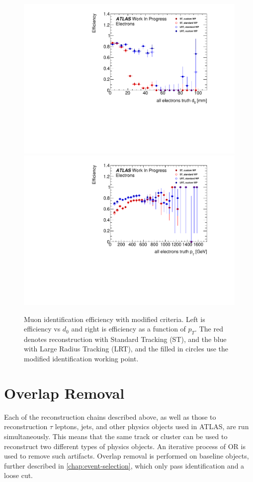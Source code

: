 \begin{figure}[htbp]
\centering
\includegraphics[width=.48\textwidth]{figures/EventReconstruction/wp_e_d0_all_wip.pdf}
\includegraphics[width=.48\textwidth]{figures/EventReconstruction/wp_e_pt_all_wip.pdf}
\caption{Muon identification efficiency with modified criteria. Left is efficiency vs $d_{0}$ and right is efficiency as a function of $p_{T}$. The red denotes reconstruction with Standard Tracking (ST), and the blue with Large Radius Tracking (LRT), and the filled in circles use the modified identification working point. }
\label{fig:cust_elec_eff}
\end{figure}

\section{Overlap Removal}
Each of the reconstruction chains described above, as well as those to reconstruction $\tau$ leptons, jets, and other physics objects used in \ac{ATLAS}, are run simultaneously. This means that the same track or cluster can be used to reconstruct two different types of physics objects. An iterative process of \ac{OR} is used to remove such artifacts. Overlap removal is performed on baseline objects, further described in \autoref{chap:event-selection}, which only pass identification and a loose \pt cut. 

